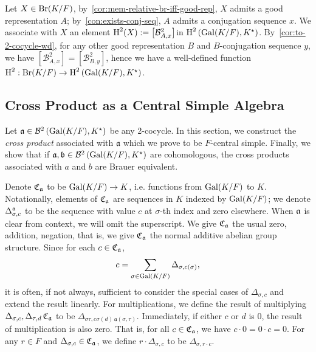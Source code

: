 \begin{construction}\label{con:br-to-snd-coh}
  Let $X \in \operatorname{Br}(K/F)$, by~\cref{cor:mem-relative-br-iff-good-rep}, $X$ admits a good representation $A$; by~\cref{con:exists-conj-seq}, $A$ admits a conjugation sequence $x$. We associate with $X$ an element $\operatorname{H}^{2}(X) := \left[\mathcal{B}^{2}_{A,x}\right]$in $\operatorname{H}^{2}\left(\operatorname{Gal}(K/F),K^{\star}\right)$. By~\cref{cor:to-2-cocycle-wd}, for any other good representation $B$ and $B$-conjugation sequence $y$, we have $\left[\mathcal{B}^{2}_{A,x}\right]=\left[\mathcal{B}^{2}_{B,y}\right]$, hence we have a well-defined function $\operatorname{H}^{2} : \operatorname{Br}(K/F) \to \operatorname{H}^{2}\left(\operatorname{Gal}(K/F),K^{\star}\right)$.
  \leanok
\end{construction}

\subsection{Cross Product as a Central Simple Algebra}

Let $\mathfrak{a} \in \mathcal{B}^{2}\left(\operatorname{Gal}(K/F), K^{\star}\right)$ be any 2-cocycle. In this section, we construct the {\em cross product\/} associated with $\mathfrak{a}$ which we prove to be $F$-central simple. Finally, we show that if $\mathfrak{a}, \mathfrak{b}\in\mathcal{B}^{2}\left(\operatorname{Gal}(K/F), K^{\star}\right)$ are cohomologous, the cross products associated with $a$ and $b$ are Brauer equivalent.

\begin{construction}\label{con:cross-product}
  Denote $\operatorname{\mathfrak{C}}_{\mathfrak{a}}$ to be $\operatorname{Gal}(K/F) \to K$, i.e. functions from $\operatorname{Gal}(K/F)$ to $K$. Notationally, elements of $\operatorname{\mathfrak{C}}_{\mathfrak{a}}$ are sequences in $K$ indexed by $\operatorname{Gal}(K/F)$; we denote $\Delta^{\mathfrak{a}}_{\sigma, c}$ to be the sequence with value $c$ at $\sigma$-th index and zero elsewhere. When $\mathfrak{a}$ is clear from context, we will omit the superscript. We give $\operatorname{\mathfrak{C}}_{\mathfrak{a}}$ the usual zero, addition, negation, that is, we give $\operatorname{\mathfrak{C}}_{\mathfrak{a}}$ the normal additive abelian group structure. Since for each $c \in \operatorname{\mathfrak{C}}_{\mathfrak{a}}$,
  \[
    c = \sum_{\sigma\in\operatorname{Gal}(K/F)}\Delta_{\sigma, c(\sigma)},
    \]
    it is often, if not always, sufficient to consider the special cases of $\Delta_{\sigma, c}$ and extend the result linearly.
  For multiplications, we define the result of multiplying $\Delta_{\sigma, c},\Delta_{\tau, d} \operatorname{\mathfrak{C}}_{\mathfrak{a}}$ to be $\Delta_{\sigma\tau, c\sigma(d)\, \mathfrak{a}(\sigma,\tau)}$. Immediately, if either $c$ or $d$ is $0$, the result of multiplication is also zero. That is, for all $c \in \operatorname{\mathfrak{C}}_{\mathfrak{a}}$, we have $c\cdot 0=0\cdot c =0$. For any $r \in F$ and $\Delta_{\sigma, c} \in \operatorname{\mathfrak{C}}_{\mathfrak{a}}$, we define $r \cdot \Delta_{\sigma, c}$ to be $\Delta_{\sigma, r\cdot c}$.
  \leanok
\end{construction}

